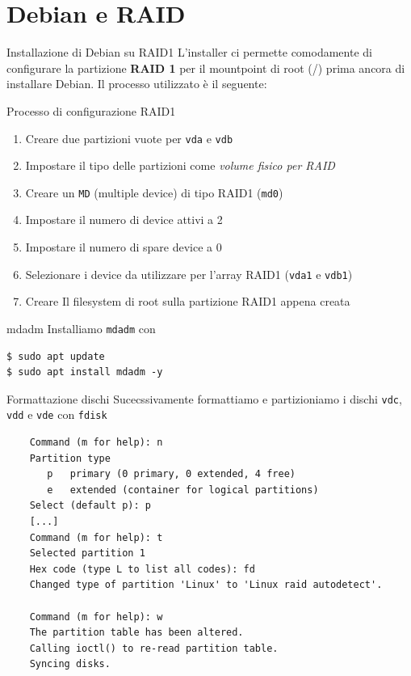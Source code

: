 \documentclass{beamer}
\begin{document}
\section{Debian e RAID}
\begin{frame}{Installazione di Debian su RAID1}
    L'installer ci permette comodamente di configurare la partizione \textbf{RAID 1} per il mountpoint di root (/) prima ancora di installare Debian. Il processo utilizzato è il seguente:
\end{frame}

\begin{frame}{Processo di configurazione RAID1}
    \begin{enumerate}
        \item Creare due partizioni vuote per \texttt{vda} e \texttt{vdb}
        \item Impostare il tipo delle partizioni come \textit{volume fisico per RAID}
        \item Creare un \texttt{MD} (multiple device) di tipo RAID1 (\texttt{md0})
        \item Impostare il numero di device attivi a 2
        \item Impostare il numero di spare device a 0
        \item Selezionare i device da utilizzare per l'array RAID1 (\texttt{vda1} e \texttt{vdb1})
        \item Creare Il filesystem di root sulla partizione RAID1 appena creata
    \end{enumerate}

\end{frame}

\begin{frame}[fragile]{mdadm}
Installiamo \texttt{mdadm} con
\begin{verbatim}
$ sudo apt update
$ sudo apt install mdadm -y
\end{verbatim}
\end{frame}

\begin{frame}[fragile]{Formattazione dischi}
Sucecssivamente formattiamo e partizioniamo i dischi \texttt{vdc}, \texttt{vdd} e \texttt{vde} con \texttt{fdisk}
\tiny\begin{lstlisting}
    Command (m for help): n
    Partition type
       p   primary (0 primary, 0 extended, 4 free)
       e   extended (container for logical partitions)
    Select (default p): p
    [...]
    Command (m for help): t
    Selected partition 1
    Hex code (type L to list all codes): fd
    Changed type of partition 'Linux' to 'Linux raid autodetect'.
    
    Command (m for help): w
    The partition table has been altered.
    Calling ioctl() to re-read partition table.
    Syncing disks.
    \end{lstlisting}
\end{frame}
\end{document}
